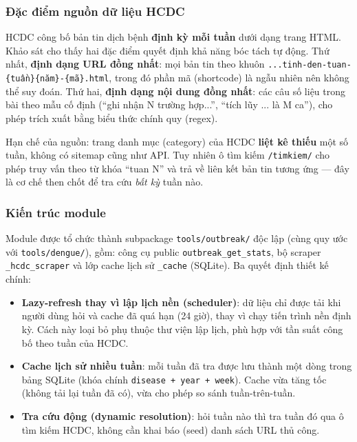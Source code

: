\documentclass[a4paper,13pt,3p,twoside,openany]{report}
\theoremstyle{definition}
\theoremstyle{remark}
\theoremstyle{definition}
\begin{document}
\subsubsection{Đặc điểm nguồn dữ liệu HCDC}

HCDC công bố bản tin dịch bệnh \textbf{định kỳ mỗi tuần} dưới dạng trang HTML. Khảo sát cho thấy hai đặc điểm quyết định khả năng bóc tách tự động. Thứ nhất, \textbf{định dạng URL đồng nhất}: mọi bản tin theo khuôn \texttt{...tinh-den-tuan-\{tuần\}\{năm\}-\{mã\}.html}, trong đó phần mã (shortcode) là ngẫu nhiên nên không thể suy đoán. Thứ hai, \textbf{định dạng nội dung đồng nhất}: các câu số liệu trong bài theo mẫu cố định (``ghi nhận N trường hợp...'', ``tích lũy ... là M ca''), cho phép trích xuất bằng biểu thức chính quy (regex).

Hạn chế của nguồn: trang danh mục (category) của HCDC \textbf{liệt kê thiếu} một số tuần, không có sitemap cũng như API. Tuy nhiên ô tìm kiếm \texttt{/timkiem/} cho phép truy vấn theo từ khóa ``tuan N'' và trả về liên kết bản tin tương ứng --- đây là cơ chế then chốt để tra cứu \textit{bất kỳ} tuần nào.

\subsubsection{Kiến trúc module}

Module được tổ chức thành subpackage \texttt{tools/outbreak/} độc lập (cùng quy ước với \texttt{tools/dengue/}), gồm: công cụ public \texttt{outbreak\_get\_stats}, bộ scraper \texttt{\_hcdc\_scraper} và lớp cache lịch sử \texttt{\_cache} (SQLite). Ba quyết định thiết kế chính:

\begin{itemize}
  \item \textbf{Lazy-refresh thay vì lập lịch nền (scheduler)}: dữ liệu chỉ được tải khi người dùng hỏi và cache đã quá hạn (24 giờ), thay vì chạy tiến trình nền định kỳ. Cách này loại bỏ phụ thuộc thư viện lập lịch, phù hợp với tần suất công bố theo tuần của HCDC.
  \item \textbf{Cache lịch sử nhiều tuần}: mỗi tuần đã tra được lưu thành một dòng trong bảng SQLite (khóa chính \texttt{disease + year + week}). Cache vừa tăng tốc (không tải lại tuần đã có), vừa cho phép so sánh tuần-trên-tuần.
  \item \textbf{Tra cứu động (dynamic resolution)}: hỏi tuần nào thì tra tuần đó qua ô tìm kiếm HCDC, không cần khai báo (seed) danh sách URL thủ công.
\end{itemize}
\end{document}
